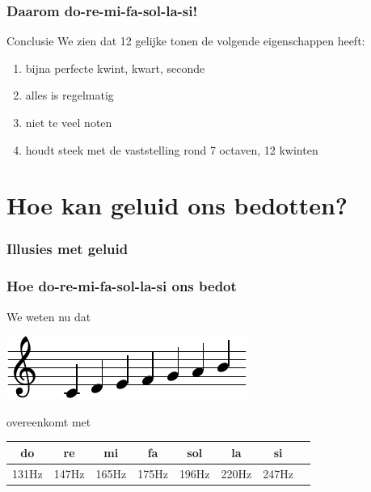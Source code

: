 \documentclass[compress, darktitle, framenumber, totalframenumber]{beamer}
\begin{document}
\begin{frame}
  \frametitle{Daarom do-re-mi-fa-sol-la-si!}

  \begin{block}{Conclusie}
    We zien dat \alert{12 gelijke tonen} de volgende eigenschappen heeft:
    \begin{enumerate}
      \item bijna perfecte kwint, kwart, seconde
      \item alles is regelmatig
      \item niet te veel noten
      \item houdt steek met de vaststelling rond 7 octaven, 12 kwinten
    \end{enumerate}
  \end{block}
\end{frame}

\section{Hoe kan geluid ons bedotten?}
\begin{frame}
  \frametitle{Illusies met geluid}

  \centering
\end{frame}

\begin{frame}
  \frametitle{Hoe do-re-mi-fa-sol-la-si ons bedot}

  We weten nu dat
  \begin{center}
    \includegraphics{scores/scale-cropped}
  \end{center}
  overeenkomt met
  \begin{center}
    \begin{tabular}[h]{cccccccc}
      do & re & mi & fa & sol & la & si \\\midrule
      131Hz & 147Hz & 165Hz & 175Hz & 196Hz & 220Hz & 247Hz
    \end{tabular}
  \end{center}
\end{frame}
\end{document}
